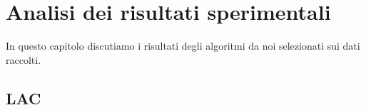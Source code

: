 \chapter{Analisi dei risultati sperimentali}
\label{capitolo4}
\thispagestyle{empty}

In questo capitolo discutiamo i risultati degli algoritmi da noi selezionati sui dati raccolti.
\section{LAC}

